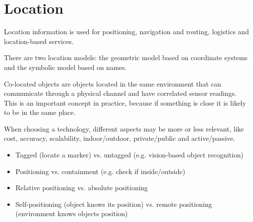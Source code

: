 \section{Location}
\begin{myremark} Location information is used for positioning, navigation and routing, logistics and location-based services.
\end{myremark}
\begin{mytitle} There are two location models: the geometric model based on coordinate systems and the symbolic model based on names.
\end{mytitle}
\begin{mytitle} Co-located objects are objects located in the same environment that can communicate through a physical channel and have correlated sensor readings. This is an important concept in practice, because if something is close it is likely to be in the same place. 
\end{mytitle}

\begin{mytitle} When choosing a technology, different aspects may be more or less relevant, like cost, accuracy, scalability, indoor/outdoor, private/public and active/passive.
\begin{itemize}
    \item Tagged (locate a marker) vs. untagged (e.g. vision-based object recognition)
    \item Positioning vs. containment (e.g. check if inside/outside)
    \item Relative positioning vs. absolute positioning
    \item Self-positioning (object knows its position) vs. remote positioning (environment knows objects position)
\end{itemize}
\end{mytitle}

